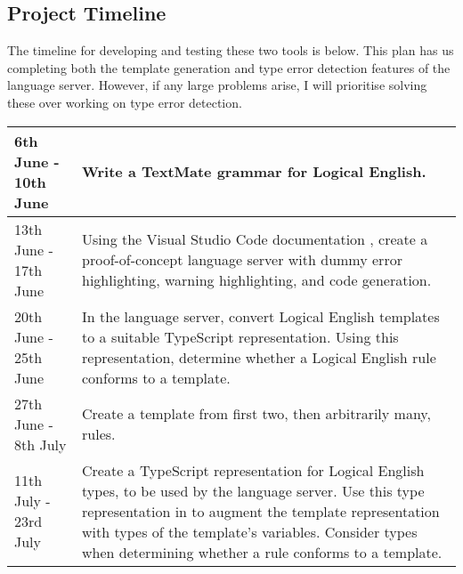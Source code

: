\documentclass[../main.tex]{subfiles}
\begin{document}
\subsection*{Project Timeline}
The timeline for developing and testing these two tools is below. This plan has us completing both the template generation and type error detection features of the language server. However, if any large problems arise, I will prioritise solving these over working on type error detection.
\\
\begin{tabularx}{\textwidth}{|l|X|}
    \hline
    6th June - 10th June & 
    Write a TextMate grammar for Logical English.
    \\
    \hline
    13th June - 17th June & 
    Using the Visual Studio Code documentation \cite[]{vsc_langserver_features}, create a proof-of-concept language server with dummy error highlighting, warning highlighting, and code generation.
    \\ \hline
    20th June - 25th June & 
    In the language server, convert Logical English templates to a suitable TypeScript representation. \newline
    Using this representation, determine whether a Logical English rule conforms to a template.
    \\ \hline
    27th June - 8th July & 
    Create a template from first two, then arbitrarily many, rules.
    \\ \hline
    11th July - 23rd July & 
    Create a TypeScript representation for Logical English types, to be used by the language server. \newline
    Use this type representation in to augment the template representation with types of the template's variables. \newline
    Consider types when determining whether a rule conforms to a template.
    \\ \hline
\end{tabularx}
\end{document}
